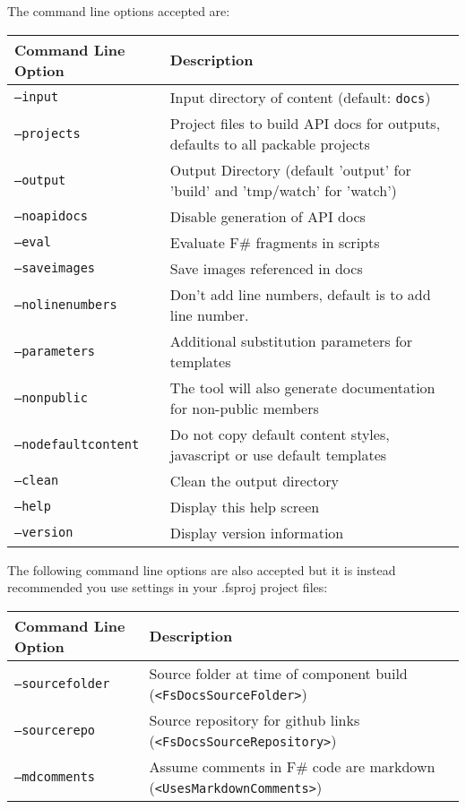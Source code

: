 \documentclass{article}
\begin{document}
The command line options accepted are:
\begin{tabular}{|l|l|}\hline
\textbf{Command Line Option} & \textbf{Description}\\ \hline\hline
\texttt{--input} & Input directory of content (default: \texttt{docs})\\ \hline
\texttt{--projects} & Project files to build API docs for outputs, defaults to all packable projects\\ \hline
\texttt{--output} & Output Directory (default 'output' for 'build' and 'tmp/watch' for 'watch')\\ \hline
\texttt{--noapidocs} & Disable generation of API docs\\ \hline
\texttt{--eval} & Evaluate F\# fragments in scripts\\ \hline
\texttt{--saveimages} & Save images referenced in docs\\ \hline
\texttt{--nolinenumbers} & Don't add line numbers, default is to add line number.\\ \hline
\texttt{--parameters} & Additional substitution parameters for templates\\ \hline
\texttt{--nonpublic} & The tool will also generate documentation for non-public members\\ \hline
\texttt{--nodefaultcontent} & Do not copy default content styles, javascript or use default templates\\ \hline
\texttt{--clean} & Clean the output directory\\ \hline
\texttt{--help} & Display this help screen\\ \hline
\texttt{--version} & Display version information\\ \hline
\end{tabular}



The following command line options are also accepted but it is instead recommended you use
settings in your .fsproj project files:
\begin{tabular}{|l|l|}\hline
\textbf{Command Line Option} & \textbf{Description}\\ \hline\hline
\texttt{--sourcefolder} & Source folder at time of component build (\texttt{<FsDocsSourceFolder>})\\ \hline
\texttt{--sourcerepo} & Source repository for github links (\texttt{<FsDocsSourceRepository>})\\ \hline
\texttt{--mdcomments} & Assume comments in F\# code are markdown (\texttt{<UsesMarkdownComments>})\\ \hline
\end{tabular}
\end{document}
